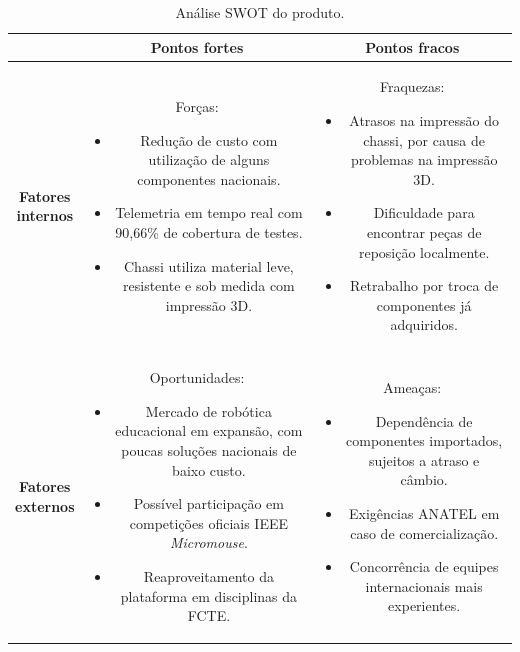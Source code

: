 \begin{table}[ht]
\centering
\caption{Análise SWOT do produto.}
\begin{tabular}{|c|c|c|} \hline
 & \textbf{Pontos fortes} & \textbf{Pontos fracos}  \\ \hline 
    {\parbox{0.1\textwidth}{ \textbf{Fatores \\ internos}}}  &
    {\parbox{0.4\textwidth}{ Forças:
        \begin{itemize}
            \item Redução de custo com utilização de alguns componentes nacionais.
            \item Telemetria em tempo real com 90,66\% de cobertura de testes.
            \item Chassi utiliza material leve, resistente e sob medida com impressão 3D.
        \end{itemize} }} &
    {\parbox{0.4\textwidth}{ Fraquezas:
        \begin{itemize}
            \item Atrasos na impressão do chassi, por causa de problemas na impressão 3D.
            \item Dificuldade para encontrar peças de reposição localmente.
            \item Retrabalho por troca de componentes já adquiridos.
        \end{itemize} }}\\ \hline
    {\parbox{0.1\textwidth}{ \textbf{Fatores \\ externos}}}  &
    {\parbox{0.4\textwidth}{ Oportunidades:
        \begin{itemize}
            \item Mercado de robótica educacional em expansão, com poucas soluções nacionais de baixo custo.
            \item Possível participação em competições oficiais IEEE \textit{Micromouse}.
            \item Reaproveitamento da plataforma em disciplinas da FCTE.
        \end{itemize} }} &
    {\parbox{0.4\textwidth}{ Ameaças:
        \begin{itemize}
            \item Dependência de componentes importados, sujeitos a atraso e câmbio.
            \item Exigências ANATEL em caso de comercialização.
            \item Concorrência de equipes internacionais mais experientes.
        \end{itemize} }}\\ \hline
\end{tabular}
\label{tab:swot}
\end{table}



